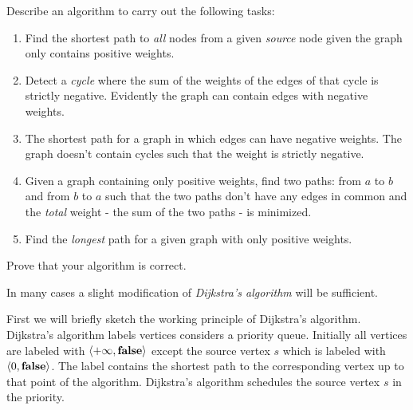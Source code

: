 \documentclass{article}
\begin{document}
\begin{exercise}
Describe an algorithm to carry out the following tasks:
\begin{enumerate}
 \item Find the shortest path to \emph{all} nodes from a given \emph{source} node given the graph only contains positive weights.
 \item Detect a \emph{cycle} where the sum of the weights of the edges of that cycle is strictly negative. Evidently the graph can contain edges with negative weights.
 \item The shortest path for a graph in which edges can have negative weights. The graph doesn't contain cycles such that the weight is strictly negative.
 \item Given a graph containing only positive weights, find two paths: from $a$ to $b$ and from $b$ to $a$ such that the two paths don't have any edges in common and the \emph{total} weight - the sum of the two paths - is minimized.
 \item Find the \emph{longest} path for a given graph with only positive weights.
\end{enumerate}
Prove that your algorithm is correct.
\begin{hint}
In many cases a slight modification of \emph{Dijkstra's algorithm} will be sufficient.
\end{hint}
\begin{answer}
First we will briefly sketch the working principle of Dijkstra's algorithm. Dijkstra's algorithm labels vertices considers a priority queue. Initially all vertices are labeled with $\left\langle +\infty,\mbox{\bf false} \right\rangle$ except the source vertex $s$ which is labeled with $\left\langle 0,\mbox{\bf false} \right\rangle$. The label contains the shortest path to the corresponding vertex up to that point of the algorithm. Dijkstra's algorithm schedules the source vertex $s$ in the priority.

\end{answer}
\end{exercise}
\end{document}
